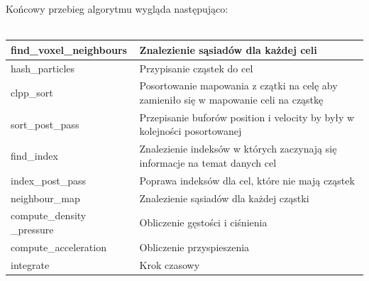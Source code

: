 \documentclass[polish, 12pt]{aghthesis}
\begin{document}
			\noindent Końcowy przebieg algorytmu wygląda następująco:
			\ \\
			\ \\
			\begin{tabular}{| p{} | p{} |}
				\hline
					find\_voxel\_neighbours & Znalezienie sąsiadów dla każdej celi \\
				\hline
					hash\_particles & Przypisanie cząstek do cel \\
				\hline
					clpp\_sort & Posortowanie mapowania z czątki na celę aby zamieniło się w mapowanie celi na cząstkę\\
				\hline
					sort\_post\_pass & Przepisanie buforów position i velocity by były w kolejności posortowanej\\
				\hline
					find\_index & Znalezienie indeksów w których zaczynają się informacje na temat danych cel \\
				\hline
					index\_post\_pass & Poprawa indeksów dla cel, które nie mają cząstek \\
				\hline
					neighbour\_map & Znalezienie sąsiadów dla każdej cząstki \\
				\hline
					compute\_density \_pressure & Obliczenie gęstości i ciśnienia \\
				\hline
					compute\_acceleration & Obliczenie przyspieszenia \\
				\hline
					integrate & Krok czasowy \\
				\hline
			\end{tabular}
			
\end{document}
